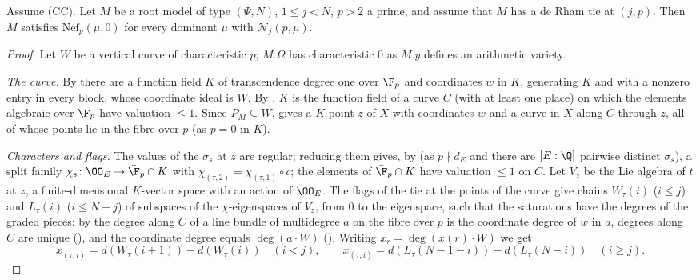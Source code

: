 \begin{lemma}\label{pf:towergeo:m2curve}
Assume \textup{(CC)}. Let $M$ be a root model of type $(\Psi,N)$, $1\le j<N$, $p>2$ a prime, and assume that $M$
has a de Rham tie at $(j,p)$. Then $M$ satisfies $\mathrm{Nef}_p(\mu,0)$ for every dominant $\mu$ with
$\mathcal N_j(p,\mu)$.
\end{lemma}

\begin{proof}
Let $W$ be a vertical curve of characteristic $p$; $M.\Omega$ has characteristic $0$ as $M.y$ defines an arithmetic
variety.

\emph{The curve.} By  there are a function field $K$ of
transcendence degree one over $\F_p$ and coordinates $w$ in $K$, generating $K$ and with a nonzero entry in every
block, whose coordinate ideal is $W$. By , $K$ is the function
field of a curve $C$ (with at least one place) on which the elements algebraic over $\F_p$ have valuation $\le1$.
Since $P_M\subseteq W$,  gives a $K$-point $z$ of $X$ with
coordinates $w$ and a curve in $X$ along $C$ through $z$, all of whose points lie in the fibre over $p$ (as $p=0$
in $K$).

\emph{Characters and flags.} The values of the $\sigma_s$ at $z$ are regular; reducing them gives, by
 (as $p\nmid d_E$ and there are $[E:\Q]$ pairwise distinct
$\sigma_s$), a split family $\chi_s\colon\OO_E\to\bar\F_p\cap K$ with $\chi_{(\tau,2)}=\chi_{(\tau,1)}\circ c$; the
elements of $\bar\F_p\cap K$ have valuation $\le1$ on $C$. Let $V_z$ be the Lie algebra of $t$ at $z$, a
finite-dimensional $K$-vector space with an action of $\OO_E$. The flags of the tie at the points of the curve give
chains $W_\tau(i)$ ($i\le j$) and $L_\tau(i)$ ($i\le N-j$) of subspaces of the $\chi$-eigenspaces of $V_z$, from
$0$ to the eigenspace, such that the saturations have the degrees of the graded pieces: by
 the degree along $C$ of a line bundle of multidegree $a$ on
the fibre over $p$ is the coordinate degree of $w$ in $a$, degrees along $C$ are unique
(), and the coordinate degree equals $\deg(a\cdot W)$
(). Writing $x_r=\deg(x(r)\cdot W)$ we get
\[
x_{(\tau,i)}=d(W_\tau(i+1))-d(W_\tau(i))\quad(i<j),\qquad
x_{(\tau,i)}=d(L_\tau(N-1-i))-d(L_\tau(N-i))\quad(i\ge j).
\]


\end{proof}
